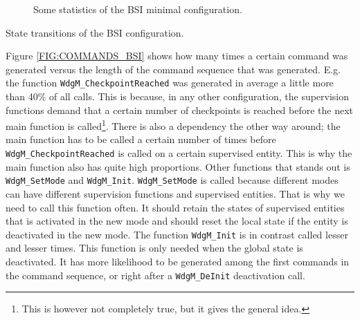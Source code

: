 \begin{figure}[!ht]
  \caption{Some statistics of the BSI minimal configuration.}
  \label{FIG:BSI}
\end{figure}

\begin{table}[!ht]
  \caption{State transitions of the BSI configuration.}
  \label{TABLE:STATUSES_BSI}
  
\end{table}

Figure \ref{FIG:COMMANDS_BSI} shows how many times a certain command
was generated versus the length of the command sequence that was
generated. E.g. the function \lstinline!WdgM_CheckpointReached! was
generated in average a little more than 40\% of all calls. This is
because, in any other configuration, the supervision functions demand
that a certain number of checkpoints is reached before the next main
function is called\footnote{This is however not completely true, but
it gives the general idea.}. There is also a dependency the other way
around; the main function has to be called a certain number of times
before \lstinline!WdgM_CheckpointReached! is called on a certain
supervised entity. This is why the main function also has quite high
proportions. Other functions that stands out is
\lstinline!WdgM_SetMode! and \lstinline!WdgM_Init!.
\lstinline!WdgM_SetMode! is called because different modes can have
different supervision functions and supervised entities. That is why
we need to call this function often. It should retain the states of
supervised entities that is activated in the new mode and should reset
the local state if the entity is deactivated in the new mode. The
function \lstinline!WdgM_Init! is in contrast called lesser and lesser
times. This function is only needed when the global state is
deactivated. It has more likelihood to be generated among the first
commands in the command sequence, or right after a
\lstinline!WdgM_DeInit! deactivation call.



